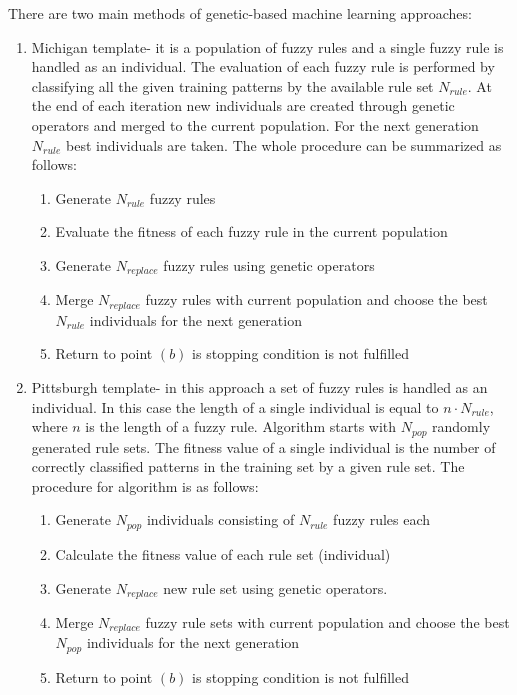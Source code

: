 There are two main methods of genetic-based machine learning approaches:
\begin{enumerate}
    \item Michigan template- it is a population of fuzzy rules and a single
        fuzzy rule is handled as an individual. The evaluation of each fuzzy
        rule is performed by classifying all the given training patterns by the
        available rule set $N_{rule}$. At the end of each iteration new
        individuals are created through genetic operators and merged to the
        current population. For the next generation $N_{rule}$ best individuals
        are taken. The whole procedure can be summarized as follows:
        \begin{enumerate}
            \item Generate $N_{rule}$ fuzzy rules
            \item Evaluate the fitness of each fuzzy rule in the current
                population
            \item Generate $N_{replace}$ fuzzy rules using genetic operators
            \item Merge $N_{replace}$ fuzzy rules with current population and
                choose the best $N_{rule}$ individuals for the next generation
            \item Return to point $(b)$ is stopping condition is not fulfilled
        \end{enumerate}
    \item Pittsburgh template- in this approach a set of fuzzy rules is handled
        as an individual. In this case the length of a single individual is
        equal to $n\cdot N_{rule}$, where $n$ is the length of a fuzzy rule.
        Algorithm starts with $N_{pop}$ randomly generated rule sets. The
        fitness value of a single individual is the number of correctly
        classified patterns in the training set by a given rule set.
        The procedure for algorithm is as follows:
        \begin{enumerate}
            \item Generate $N_{pop}$ individuals consisting of $N_{rule}$ fuzzy
                rules each
            \item Calculate the fitness value of each rule set (individual)
            \item Generate $N_{replace}$ new rule set using genetic operators.  
            \item Merge $N_{replace}$ fuzzy rule sets  with current population and
                choose the best $N_{pop}$ individuals for the next generation
            \item Return to point $(b)$ is stopping condition is not fulfilled
        \end{enumerate}
\end{enumerate}
